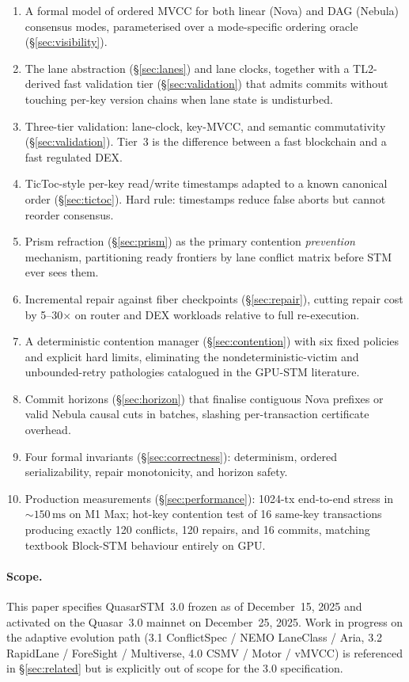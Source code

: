 \begin{enumerate}[leftmargin=2em]
\item A formal model of ordered MVCC for both linear (Nova) and DAG
      (Nebula) consensus modes, parameterised over a mode-specific
      ordering oracle (\S\ref{sec:visibility}).
\item The lane abstraction (\S\ref{sec:lanes}) and lane clocks,
      together with a TL2-derived fast validation tier
      (\S\ref{sec:validation}) that admits commits without touching
      per-key version chains when lane state is undisturbed.
\item Three-tier validation: lane-clock, key-MVCC, and semantic
      commutativity (\S\ref{sec:validation}). Tier~3 is the difference
      between a fast blockchain and a fast regulated DEX.
\item TicToc-style per-key read/write timestamps adapted to a known
      canonical order (\S\ref{sec:tictoc}). Hard rule: timestamps
      reduce false aborts but cannot reorder consensus.
\item Prism refraction (\S\ref{sec:prism}) as the primary contention
      \emph{prevention} mechanism, partitioning ready frontiers by
      lane conflict matrix before STM ever sees them.
\item Incremental repair against fiber checkpoints
      (\S\ref{sec:repair}), cutting repair cost by 5--30$\times$ on
      router and DEX workloads relative to full re-execution.
\item A deterministic contention manager (\S\ref{sec:contention})
      with six fixed policies and explicit hard limits, eliminating
      the nondeterministic-victim and unbounded-retry pathologies
      catalogued in the GPU-STM literature.
\item Commit horizons (\S\ref{sec:horizon}) that finalise contiguous
      Nova prefixes or valid Nebula causal cuts in batches, slashing
      per-transaction certificate overhead.
\item Four formal invariants (\S\ref{sec:correctness}): determinism,
      ordered serializability, repair monotonicity, and horizon
      safety.
\item Production measurements (\S\ref{sec:performance}): 1024-tx
      end-to-end stress in ${\sim}150\,\text{ms}$ on M1 Max;
      hot-key contention test of 16 same-key transactions producing
      exactly 120 conflicts, 120 repairs, and 16 commits, matching
      textbook Block-STM behaviour entirely on GPU.
\end{enumerate}

\paragraph{Scope.}
This paper specifies QuasarSTM~3.0 frozen as of December~15, 2025
and activated on the Quasar~3.0 mainnet on December~25, 2025. Work in
progress on the adaptive evolution path (3.1 ConflictSpec / NEMO
LaneClass / Aria, 3.2 RapidLane / ForeSight / Multiverse, 4.0 CSMV /
Motor / vMVCC) is referenced in \S\ref{sec:related} but is explicitly
out of scope for the 3.0 specification.


